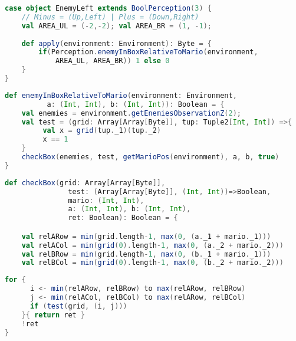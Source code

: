 \begin{minipage}{0.9\linewidth}
\centering
\begin{lstlisting}[language=scala]
case object EnemyLeft extends BoolPerception(3) {
    // Minus = (Up,Left) | Plus = (Down,Right)
    val AREA_UL = (-2,-2); val AREA_BR = (1, -1);
  
    def apply(environment: Environment): Byte = {
        if(Perception.enemyInBoxRelativeToMario(environment,
            AREA_UL, AREA_BR)) 1 else 0  
    }
}
\end{lstlisting}
\end{minipage}

\begin{minipage}{0.9\linewidth}
\centering
\begin{lstlisting}[language=scala]
def enemyInBoxRelativeToMario(environment: Environment, 
          a: (Int, Int), b: (Int, Int)): Boolean = {
    val enemies = environment.getEnemiesObservationZ(2);
    val test = (grid: Array[Array[Byte]], tup: Tuple2[Int, Int]) =>{
         val x = grid(tup._1)(tup._2)
         x == 1
    }
    checkBox(enemies, test, getMarioPos(environment), a, b, true)
}
\end{lstlisting}
\end{minipage}

\begin{minipage}{0.9\linewidth}
\centering
\begin{lstlisting}[language=scala]
def checkBox(grid: Array[Array[Byte]], 
               test: (Array[Array[Byte]], (Int, Int))=>Boolean, 
               mario: (Int, Int), 
               a: (Int, Int), b: (Int, Int), 
               ret: Boolean): Boolean = {

    val relARow = min(grid.length-1, max(0, (a._1 + mario._1)))
    val relACol = min(grid(0).length-1, max(0, (a._2 + mario._2)))
    val relBRow = min(grid.length-1, max(0, (b._1 + mario._1)))
    val relBCol = min(grid(0).length-1, max(0, (b._2 + mario._2)))
\end{lstlisting}
\end{minipage}

\begin{minipage}{0.9\linewidth}
\centering
\begin{lstlisting}[language=scala]   
    for {
      i <- min(relARow, relBRow) to max(relARow, relBRow)
      j <- min(relACol, relBCol) to max(relARow, relBCol)
      if (test(grid, (i, j)))
    }{ return ret }
    !ret
}
\end{lstlisting}
\end{minipage}



